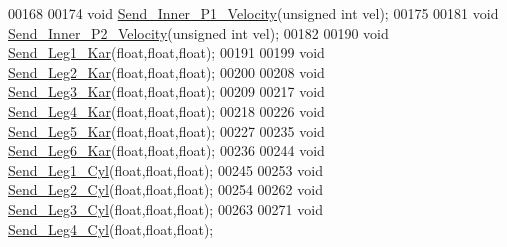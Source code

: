 \begin{DoxyCode}
00168 
00174 \textcolor{keywordtype}{void} \hyperlink{servo___u_a_r_t_8h_ace1792c5f066181d607cb075a87f3178}{Send\_Inner\_P1\_Velocity}(\textcolor{keywordtype}{unsigned} \textcolor{keywordtype}{int} vel); 
00175 
00181 \textcolor{keywordtype}{void} \hyperlink{servo___u_a_r_t_8h_a9cb7e763d9a3501fc345a424d67975a7}{Send\_Inner\_P2\_Velocity}(\textcolor{keywordtype}{unsigned} \textcolor{keywordtype}{int} vel); 
00182 
00190 \textcolor{keywordtype}{void} \hyperlink{servo___u_a_r_t_8h_adde8722cd4b494d02bce7a39b14aed52}{Send\_Leg1\_Kar}(\textcolor{keywordtype}{float},\textcolor{keywordtype}{float},\textcolor{keywordtype}{float});
00191 
00199 \textcolor{keywordtype}{void} \hyperlink{servo___u_a_r_t_8h_a85bfa5d3057fbf4096d5fc8665d717b8}{Send\_Leg2\_Kar}(\textcolor{keywordtype}{float},\textcolor{keywordtype}{float},\textcolor{keywordtype}{float});
00200 
00208 \textcolor{keywordtype}{void} \hyperlink{servo___u_a_r_t_8h_a855b410dfcceb0e5f25d57ee17f86932}{Send\_Leg3\_Kar}(\textcolor{keywordtype}{float},\textcolor{keywordtype}{float},\textcolor{keywordtype}{float});
00209 
00217 \textcolor{keywordtype}{void} \hyperlink{servo___u_a_r_t_8h_adc36f085a0d265c937fae59651a06703}{Send\_Leg4\_Kar}(\textcolor{keywordtype}{float},\textcolor{keywordtype}{float},\textcolor{keywordtype}{float});
00218 
00226 \textcolor{keywordtype}{void} \hyperlink{servo___u_a_r_t_8h_a0945e0fa1be61238d314e7334bdc9990}{Send\_Leg5\_Kar}(\textcolor{keywordtype}{float},\textcolor{keywordtype}{float},\textcolor{keywordtype}{float});
00227 
00235 \textcolor{keywordtype}{void} \hyperlink{servo___u_a_r_t_8h_a2178defeed6cf9781991514439dd799b}{Send\_Leg6\_Kar}(\textcolor{keywordtype}{float},\textcolor{keywordtype}{float},\textcolor{keywordtype}{float});
00236 
00244 \textcolor{keywordtype}{void} \hyperlink{servo___u_a_r_t_8h_af1a73e7eb43491c163ad5031a2506a00}{Send\_Leg1\_Cyl}(\textcolor{keywordtype}{float},\textcolor{keywordtype}{float},\textcolor{keywordtype}{float});
00245 
00253 \textcolor{keywordtype}{void} \hyperlink{servo___u_a_r_t_8h_a5bf2231681a97180dd8f31da17814b9e}{Send\_Leg2\_Cyl}(\textcolor{keywordtype}{float},\textcolor{keywordtype}{float},\textcolor{keywordtype}{float});
00254 
00262 \textcolor{keywordtype}{void} \hyperlink{servo___u_a_r_t_8h_ae482cf70fc4b70fe8f4201eeffc54f51}{Send\_Leg3\_Cyl}(\textcolor{keywordtype}{float},\textcolor{keywordtype}{float},\textcolor{keywordtype}{float});
00263 
00271 \textcolor{keywordtype}{void} \hyperlink{servo___u_a_r_t_8h_ab2b44997220df53e3737bfc35bc8b0aa}{Send\_Leg4\_Cyl}(\textcolor{keywordtype}{float},\textcolor{keywordtype}{float},\textcolor{keywordtype}{float});

\end{DoxyCode}
